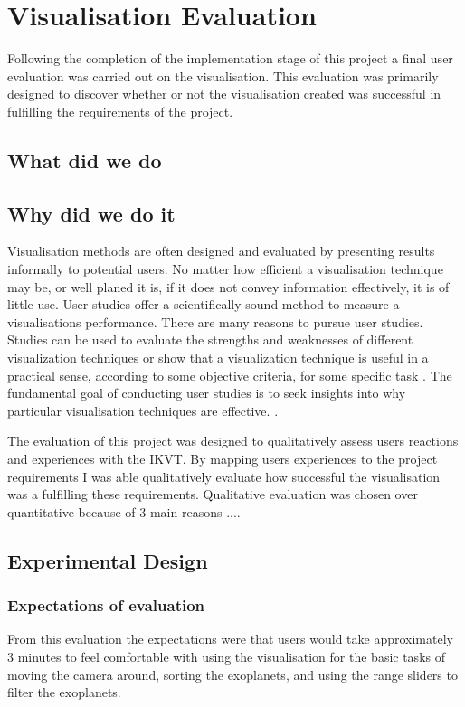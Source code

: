 \chapter{Visualisation Evaluation}\label{C:eval}
Following the completion of the implementation stage of this project a final
user evaluation was carried out on the visualisation. This evaluation was
primarily designed to discover whether or not the visualisation created was
successful in fulfilling the requirements of the project.

\section{What did we do}
\section{Why did we do it}
Visualisation methods are often designed and evaluated by presenting 
results informally to potential users. No matter how 
efficient a visualisation technique may be, or well planed it is, if it does
not convey information 
effectively, it is of little use. User studies offer a 
scientifically sound method to measure a visualisations 
performance. There are many reasons to pursue user studies. Studies can 
be used to evaluate the strengths and weaknesses of 
different visualization techniques or show that a visualization technique is 
useful in a practical sense, according to some objective 
criteria, for some specific task \cite{kosara2003thoughts}. 
The fundamental goal of conducting user studies is to 
seek insights into why particular visualisation techniques are effective.
\cite{kosara2003thoughts}.

The evaluation of this project was designed to qualitatively assess users
reactions and experiences with the IKVT. By mapping users experiences to the
project requirements I was able qualitatively evaluate how successful the
visualisation
was a fulfilling these requirements. Qualitative evaluation was chosen over
quantitative because of 3 main reasons ....~

\section{Experimental Design}
\subsection{Expectations of evaluation}
From this evaluation the expectations were that users would take approximately 3
minutes to feel comfortable with using the visualisation for the basic tasks of
moving the camera around, sorting the exoplanets, and using the range sliders to
filter the exoplanets. 

